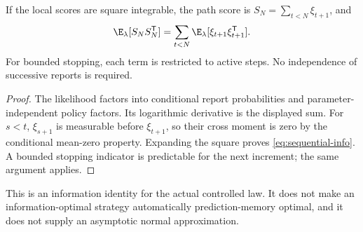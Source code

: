 \begin{proposition}\label{prop:sequential-score}
If the local scores are square integrable, the path score is
$S_N=\sum_{t<N}\xi_{t+1}$, and
\begin{equation}\label{eq:sequential-info}
 \E_\lambda[S_NS_N^{\mathsf T}]
 =\sum_{t<N}\E_\lambda[
 \xi_{t+1}\xi_{t+1}^{\mathsf T}].
\end{equation}
For bounded stopping, each term is restricted to active steps. No
independence of successive reports is required.
\end{proposition}
\begin{proof}
The likelihood factors into conditional report probabilities and
parameter-independent policy factors. Its logarithmic derivative is the
displayed sum. For $s<t$, $\xi_{s+1}$ is measurable before $\xi_{t+1}$,
so their cross moment is zero by the conditional mean-zero property.
Expanding the square proves \eqref{eq:sequential-info}. A bounded stopping
indicator is predictable for the next increment; the same argument applies.
\end{proof}

This is an information identity for the actual controlled law. It does not
make an information-optimal strategy automatically prediction-memory
optimal, and it does not supply an asymptotic normal approximation.
